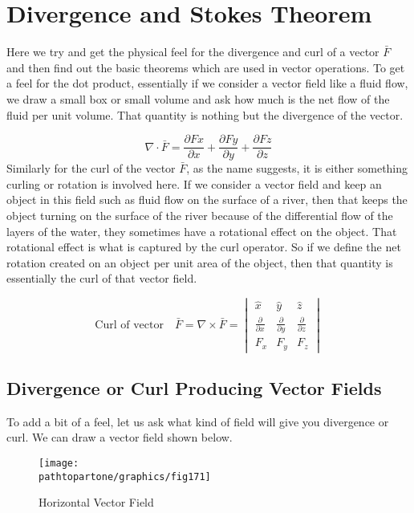 \chapter{Divergence and Stokes Theorem}\label{lec:lec17}
Here we try and get the physical feel for the divergence and curl of a vector $\bar{F}$  and then find out the basic theorems which are used in vector operations.
To get a feel for the dot product, essentially if we consider a vector field like a fluid flow, we draw a small box or small volume and ask how much is the net flow of the fluid per unit volume. That quantity is nothing but the divergence of the vector.

\begin{equation}
\nabla\cdot \bar{F} = \frac{\partial Fx}{\partial x} + \frac{\partial Fy}{\partial y} + \frac{\partial Fz}{\partial z}	
\end{equation}
Similarly for the curl of the vector $\bar{F}$, as the name suggests, it is either something curling or rotation is involved here. If we consider a vector field and keep an object in this field such as fluid flow on the surface of a river, then that keeps the object turning on the surface of the river because of the differential flow of the layers of the water, they sometimes have a rotational effect on the object. That rotational effect is what is captured by the curl operator. So if we define the net rotation created on an object per unit area of the object, then that quantity is essentially the curl of that vector field.

\begin{dmath*}
\text{Curl of vector} \quad \bar{F} = \nabla \times \bar{F} = 
\begin{vmatrix}
\hat{x} & \hat{y} & \hat{z}\\
\frac{\partial}{\partial x} & \frac{\partial}{\partial y} & \frac{\partial}{\partial z}\\
F_{x} & F_{y} & F_{z}
\end{vmatrix}
\end{dmath*}

\section{Divergence or Curl Producing Vector Fields}
To add a bit of a feel, let us ask what kind of field will give you divergence or curl. We can draw a vector field shown below.
\begin{figure}[h]
\centering
\texttt{[image: \\pathtopartone/graphics/fig171]}
\caption{Horizontal Vector Field}
\end{figure}

